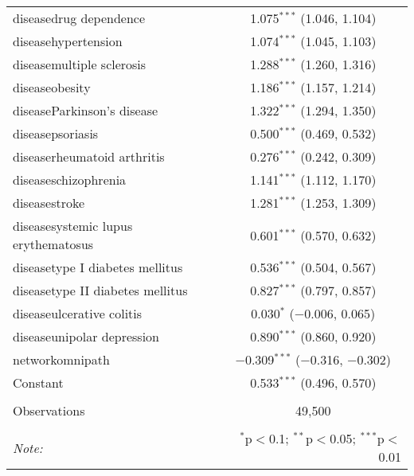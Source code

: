 \begin{table}[!htbp]
\begin{tabular}{@{\extracolsep{5pt}}lc}
  diseasedrug dependence & 1.075$^{***}$ (1.046, 1.104) \\ 
  diseasehypertension & 1.074$^{***}$ (1.045, 1.103) \\ 
  diseasemultiple sclerosis & 1.288$^{***}$ (1.260, 1.316) \\ 
  diseaseobesity & 1.186$^{***}$ (1.157, 1.214) \\ 
  diseaseParkinson's disease & 1.322$^{***}$ (1.294, 1.350) \\ 
  diseasepsoriasis & 0.500$^{***}$ (0.469, 0.532) \\ 
  diseaserheumatoid arthritis & 0.276$^{***}$ (0.242, 0.309) \\ 
  diseaseschizophrenia & 1.141$^{***}$ (1.112, 1.170) \\ 
  diseasestroke & 1.281$^{***}$ (1.253, 1.309) \\ 
  diseasesystemic lupus erythematosus & 0.601$^{***}$ (0.570, 0.632) \\ 
  diseasetype I diabetes mellitus & 0.536$^{***}$ (0.504, 0.567) \\ 
  diseasetype II diabetes mellitus & 0.827$^{***}$ (0.797, 0.857) \\ 
  diseaseulcerative colitis & 0.030$^{*}$ ($-$0.006, 0.065) \\ 
  diseaseunipolar depression & 0.890$^{***}$ (0.860, 0.920) \\ 
  networkomnipath & $-$0.309$^{***}$ ($-$0.316, $-$0.302) \\ 
  Constant & 0.533$^{***}$ (0.496, 0.570) \\ 
 \hline \\[-1.8ex] 
Observations & 49,500 \\ 
\hline 
\hline \\[-1.8ex] 
\textit{Note:}  & \multicolumn{1}{r}{$^{*}$p$<$0.1; $^{**}$p$<$0.05; $^{***}$p$<$0.01} \\ 
\end{tabular} 
\end{table} 
